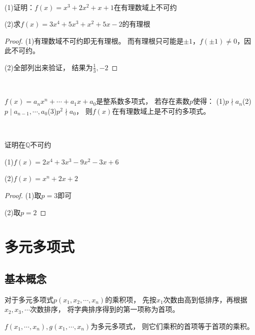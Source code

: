 ~

\begin{exercise}[计算有理根]
  (1)证明：$f(x) = x^3 + 2x^2 + x + 1$在有理数域上不可约

  (2)求$f(x) = 3x^4 + 5x^3 + x^2 + 5x - 2$的有理根
\end{exercise}

\begin{proof}
  (1)有理数域不可约即无有理根。
  而有理根只可能是$\pm 1$，$f(\pm 1) \neq 0$，因此不可约。

  (2)全部列出来验证，
  结果为$\frac{1}{3}, -2$
\end{proof}


~

\begin{theorem}[Eisenstein判别法]
  $f(x) = a_nx^n + \cdots + a_1x + a_0$是整系数多项式，
  若存在素数$p$使得：
  (1)$p \nmid a_n$(2)$p \mid a_{n-1},\cdots,a_0$(3)$p^2 \nmid a_0$，
  则$f(x)$在有理数域上是不可约多项式。
\end{theorem}

~

\begin{exercise}[使用Eisenstein判别法]
  证明在$\mathbb{Q}$不可约

  (1)$f(x) = 2x^4 + 3x^3 - 9x^2 -3x + 6$

  (2)$f(x) = x^n + 2x + 2$
\end{exercise}

\begin{proof}
  (1)取$p = 3$即可

  (2)取$p = 2$
\end{proof}

\section{多元多项式}

\subsection{基本概念}

\begin{definition}[字典排序]
  对于多元多项式$p(x_1,x_2,\cdots,x_n)$的乘积项，
  先按$x_1$次数由高到低排序，再根据$x_2,x_3,\cdots$次数排序，
  将字典排序得到的第一项称为首项。
\end{definition}

\begin{theorem}[乘积保首项]
  $f(x_1,\cdots,x_n), g(x_1,\cdots,x_n)$为多元多项式，
  则它们乘积的首项等于首项的乘积。
\end{theorem}

